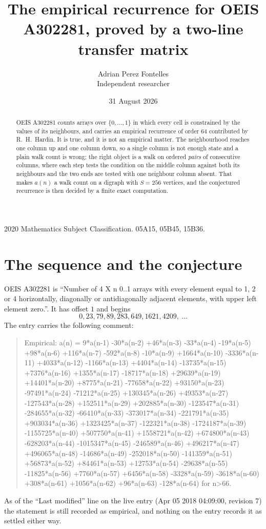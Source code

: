 \documentclass[11pt,a4paper]{article}
\title{The empirical recurrence for OEIS A302281, proved by a two-line transfer matrix}
\author{Adrian Perez Fontelles\\ \small Independent researcher}
\date{31 August 2026}
\theoremstyle{plain}
\theoremstyle{definition}
\begin{document}
\maketitle

\begin{abstract}
OEIS A302281 counts arrays over $\{0,\dots,1\}$ in which every cell is constrained by the
values of its neighbours, and carries an empirical recurrence of order $64$ contributed
by R.~H.~Hardin. It is true, and it is not an empirical matter. The neighbourhood reaches one
column up and one column down, so a single column is not enough state and a plain walk count
is wrong; the right object is a walk on ordered \emph{pairs} of consecutive columns, where
each step tests the condition on the middle column against both its neighbours and the two
ends are tested with one neighbour column absent. That makes $a(n)$ a walk count on a digraph
with $S=256$ vertices, and the conjectured recurrence is then decided by a finite exact
computation.
\end{abstract}

\noindent\small 2020 Mathematics Subject Classification. 05A15, 05B45, 15B36.\normalsize

\section{The sequence and the conjecture}

OEIS A302281 is ``Number of 4 X n 0..1 arrays with every element equal to 1, 2 or 4 horizontally, diagonally or antidiagonally adjacent elements, with upper left element zero.''. It has offset $1$ and begins
\[
0, 23, 79, 89, 283, 649, 1621, 4209,\ \dots
\]
The entry carries the following comment:
\begin{quote}\small
Empirical: a(n) = 9*a(n-1) -30*a(n-2) +46*a(n-3) -33*a(n-4) -19*a(n-5) +98*a(n-6) +116*a(n-7) -592*a(n-8) -10*a(n-9) +1664*a(n-10) -3336*a(n-11) +4033*a(n-12) -1166*a(n-13) +4404*a(n-14) -13735*a(n-15) +7376*a(n-16) +1355*a(n-17) -18717*a(n-18) +29639*a(n-19) +14401*a(n-20) +8775*a(n-21) -77658*a(n-22) +93150*a(n-23) -97491*a(n-24) -71212*a(n-25) +130345*a(n-26) +49353*a(n-27) -127543*a(n-28) +152511*a(n-29) +202885*a(n-30) -123547*a(n-31) -284655*a(n-32) -66410*a(n-33) -373017*a(n-34) -221791*a(n-35) +903034*a(n-36) +1323425*a(n-37) -122321*a(n-38) -1724187*a(n-39) -1155725*a(n-40) +507750*a(n-41) +1558721*a(n-42) +674800*a(n-43) -628203*a(n-44) -1015347*a(n-45) -246589*a(n-46) +496217*a(n-47) +496065*a(n-48) -14686*a(n-49) -252018*a(n-50) -141359*a(n-51) +56873*a(n-52) +84461*a(n-53) +12753*a(n-54) -29638*a(n-55) -11825*a(n-56) +7760*a(n-57) +6456*a(n-58) -3328*a(n-59) -3618*a(n-60) +308*a(n-61) +1056*a(n-62) +96*a(n-63) -128*a(n-64) for n>66.
\end{quote}
As of the ``Last modified'' line on the live entry (Apr 05 2018 04:09:00, revision 7) the statement is
still recorded as empirical, and nothing on the entry records it as settled either way.
\end{document}
